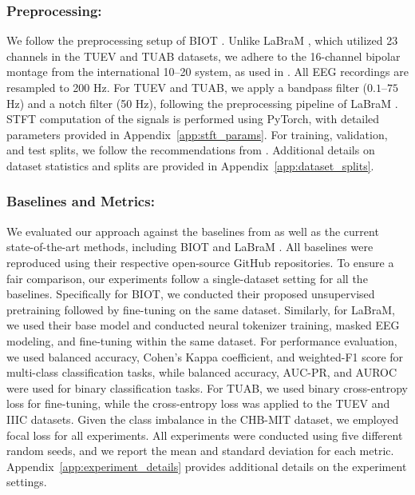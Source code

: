 


\subsubsection{Preprocessing:} We follow the preprocessing setup of BIOT \cite{yang2024biot}. Unlike LaBraM \cite{jiang2024large}, which utilized 23 channels in the TUEV and TUAB datasets, we adhere to the 16-channel bipolar montage from the international 10–20 system, as used in \cite{yang2024biot}. All EEG recordings are resampled to 200 Hz. For TUEV and TUAB, we apply a bandpass filter ($0.1$–$75$ Hz) and a notch filter (50 Hz), following the preprocessing pipeline of LaBraM \cite{jiang2024large}. STFT computation of the signals is performed using PyTorch, with detailed parameters provided in Appendix~\ref{app:stft_params}. For training, validation, and test splits, we follow the recommendations from \cite{yang2024biot}. Additional details on dataset statistics and splits are provided in Appendix~\ref{app:dataset_splits}.


\subsubsection{Baselines and Metrics:} We evaluated our approach against the baselines from \cite{yang2024biot} as well as the current state-of-the-art methods, including BIOT \cite{yang2024biot} and LaBraM \cite{jiang2024large}. All baselines were reproduced using their respective open-source GitHub repositories. To ensure a fair comparison, our experiments follow a single-dataset setting for all the baselines. Specifically for BIOT, we conducted their proposed unsupervised pretraining followed by fine-tuning on the same dataset. Similarly, for LaBraM, we used their base model and conducted neural tokenizer training, masked EEG modeling, and fine-tuning within the same dataset. For performance evaluation, we used balanced accuracy, Cohen's Kappa coefficient, and weighted-F1 score for multi-class classification tasks, while balanced accuracy, AUC-PR, and AUROC were used for binary classification tasks. For TUAB, we used binary cross-entropy loss for fine-tuning, while the cross-entropy loss was applied to the TUEV and IIIC datasets. Given the class imbalance in the CHB-MIT dataset, we employed focal loss for all experiments. All experiments were conducted using five different random seeds, and we report the mean and standard deviation for each metric. Appendix~\ref{app:experiment_details} provides additional details on the experiment settings.



